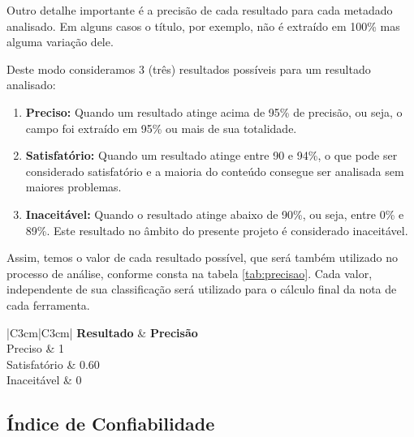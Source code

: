 
Outro detalhe importante é a precisão de cada resultado para cada metadado analisado. Em alguns casos o título, por exemplo, não é extraído em 100\% mas alguma variação dele. 

Deste modo consideramos 3 (três) resultados possíveis para um resultado analisado:

\begin{enumerate}
\item \textbf{Preciso:} Quando um resultado atinge acima de 95\% de precisão, ou seja, o campo foi extraído em 95\% ou mais de sua totalidade.
\item \textbf{Satisfatório:} Quando um resultado atinge entre 90 e 94\%, o que pode ser considerado satisfatório e a maioria do conteúdo consegue ser analisada sem maiores problemas.
\item \textbf{Inaceitável:} Quando o resultado atinge abaixo de 90\%, ou seja, entre 0\% e 89\%. Este resultado no âmbito do presente projeto é considerado inaceitável.
\end{enumerate}

Assim, temos o valor de cada resultado possível, que será também utilizado no processo de análise, conforme consta na tabela \ref{tab:precisao}. Cada valor, independente de sua classificação será utilizado para o cálculo final da nota de cada ferramenta.


\begin{table}
    \caption{Resultados obtidos em cada metadado e sua precisão}
    \begin{center}
    	\begin{tabular}{|C{3cm}|C{3cm}|}
			\hline \textbf{Resultado} & \textbf{Precisão} \\ 
			\hline Preciso & 1\\
	    	\hline Satisfatório & 0.60 \\
	    	\hline Inaceitável & 0 \\
	    	\hline 
    	\end{tabular} 
    \end{center}
  	\label{tab:precisao}
\end{table}

\subsection{Índice de Confiabilidade}

